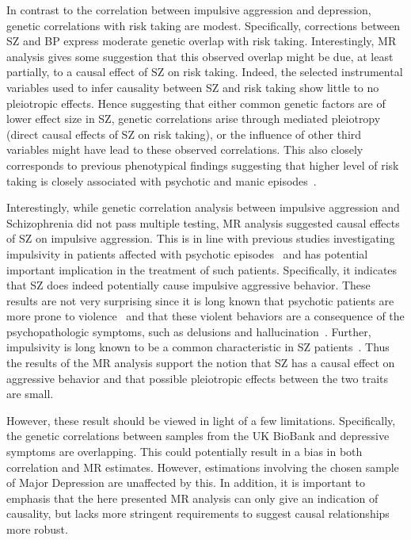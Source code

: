 In contrast to the correlation between impulsive aggression and depression, genetic correlations with risk taking are modest.
Specifically, corrections between SZ and BP express moderate genetic overlap with risk taking.
Interestingly, MR analysis gives some suggestion that this observed overlap might be due, at least partially, to a causal effect of SZ on risk taking.
Indeed, the selected instrumental variables used to infer causality between SZ and risk taking show little to no pleiotropic effects.
Hence suggesting that either common genetic factors are of lower effect size in SZ, genetic correlations arise through mediated pleiotropy (direct causal effects of SZ on risk taking), or the influence of other third variables might have lead to these observed correlations. 
This also closely corresponds to previous phenotypical findings suggesting that higher level of risk taking is closely associated with psychotic and manic episodes~\cite{Johnson2012,APA1994,AmericanPsychiatricAssociation2013}.

Interestingly, while genetic correlation analysis between impulsive aggression and Schizophrenia did not pass multiple testing, MR analysis suggested causal effects of SZ on impulsive aggression. 
This is in line with previous studies investigating impulsivity in patients affected with psychotic episodes~\cite{Ouzir2013} and has potential important implication in the treatment of such patients.
Specifically, it indicates that SZ does indeed potentially cause impulsive aggressive behavior.
These results are not very surprising since it is long known that psychotic patients are more prone to violence~\cite{Douglas2009} and that these violent behaviors are a consequence of the psychopathologic symptoms, such as delusions and hallucination~\cite{Swanson2006}.
Further, impulsivity is long known to be a common characteristic in SZ patients~\citet{Ouzir2013}.
Thus the results of the MR analysis support the notion that SZ has a causal effect on aggressive behavior and that possible pleiotropic effects between the two traits are small.


However, these result should be viewed in light of a few limitations.
Specifically, the genetic correlations between samples from the UK BioBank and depressive symptoms are overlapping.
This could potentially result in a bias in both correlation and MR estimates.
However, estimations involving the chosen sample of Major Depression are unaffected by this.
In addition, it is important to emphasis that the here presented MR analysis can only give an indication of causality, but lacks more stringent requirements to suggest causal relationships more robust.

